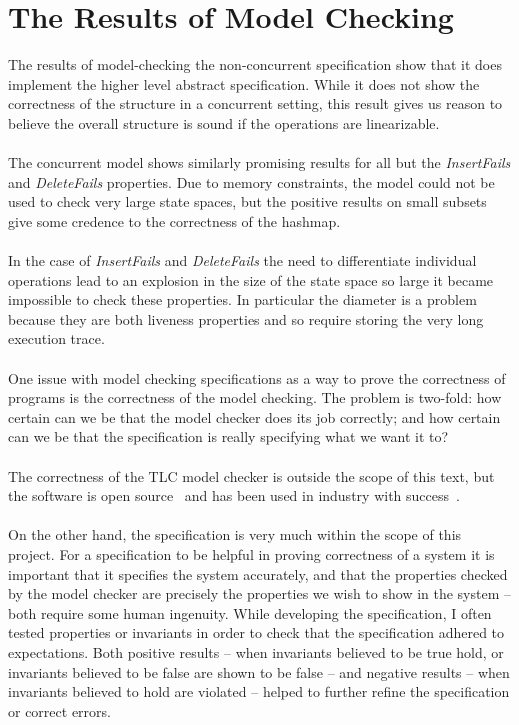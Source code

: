 \documentclass{uit-thesis}
\begin{document}
\section{The Results of Model Checking}
The results of model-checking the non-concurrent specification show that it does implement the higher level abstract specification. While it does not show the correctness of the structure in a concurrent setting, this result gives us reason to believe the overall structure is sound if the operations are linearizable.
\\\\
The concurrent model shows similarly promising results for all but the \textit{InsertFails} and \textit{DeleteFails} properties. Due to memory constraints, the model could not be used to check very large state spaces, but the positive results on small subsets give some credence to the correctness of the hashmap.
\\\\
In the case of \textit{InsertFails} and \textit{DeleteFails} the need to differentiate individual operations lead to an explosion in the size of the state space so large it became impossible to check these properties. In particular the diameter is a problem because they are both liveness properties and so require storing the very long execution trace.
\\\\
One issue with model checking specifications as a way to prove the correctness of programs is the correctness of the model checking. The problem is two-fold: how certain can we be that the model checker does its job correctly; and how certain can we be that the specification is really specifying what we want it to?
\\\\
The correctness of the TLC model checker is outside the scope of this text, but the software is open source~\cite{TLAplus} and has been used in industry with success~\cite{Amazon2015, Lamport-Batson2002}.
\\\\
On the other hand, the specification is very much within the scope of this project. For a specification to be helpful in proving correctness of a system it is important that it specifies the system accurately, and that the properties checked by the model checker are precisely the properties we wish to show in the system -- both require some human ingenuity. While developing the specification, I often tested properties or invariants in order to check that the specification adhered to expectations. Both positive results -- when invariants believed to be true hold, or invariants believed to be false are shown to be false -- and negative results -- when invariants believed to hold are violated -- helped to further refine the specification or correct errors.
\end{document}
